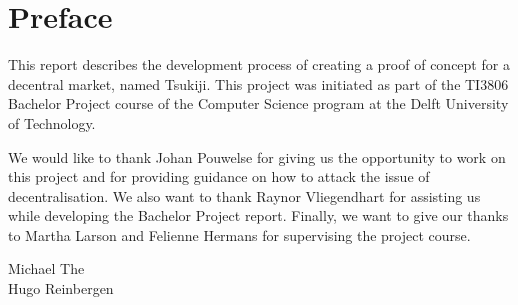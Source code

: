 \section*{Preface}
This report describes the development process of creating a proof of concept for a decentral market, named Tsukiji. 
This project was initiated as part of the TI3806 Bachelor Project course of the Computer Science program at the Delft University of Technology.

We would like to thank Johan Pouwelse for giving us the opportunity to work on this project and for providing guidance on how to attack the issue of decentralisation.
We also want to thank Raynor Vliegendhart for assisting us while developing the Bachelor Project report.
Finally, we want to give our thanks to Martha Larson and Felienne Hermans for supervising the project course.

\begin{flushright}
Michael The \\
Hugo Reinbergen
\end{flushright}